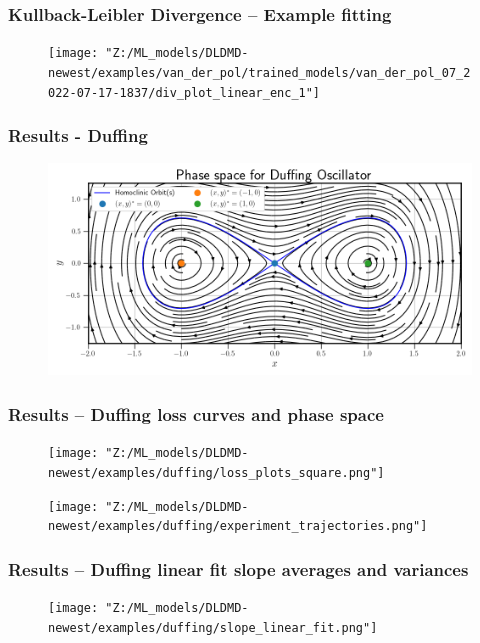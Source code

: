 \documentclass[11pt,aspectratio=169]{beamer}
\begin{document}
    \begin{frame}
        \frametitle{Kullback-Leibler Divergence -- Example fitting}
        \begin{figure}
            \centering
            \texttt{[image: "Z:/ML\_models/DLDMD-newest/examples/van\_der\_pol/trained\_models/van\_der\_pol\_07\_2022-07-17-1837/div\_plot\_linear\_enc\_1"]}
        \end{figure}
    \end{frame}

    \begin{frame}
        \frametitle{Results - Duffing}
        \begin{figure}
            \centering
            \includegraphics[width=\textwidth]{../Figures/duffing_phase_space.png}
        \end{figure}
    \end{frame}

    \begin{frame}
        \frametitle{Results -- Duffing loss curves and phase space}
        \begin{figure}
            \centering
            \begin{minipage}{.5\textwidth}
                \texttt{[image: "Z:/ML\_models/DLDMD-newest/examples/duffing/loss\_plots\_square.png"]}
            \end{minipage}%
            \begin{minipage}{.5\textwidth}
                \texttt{[image: "Z:/ML\_models/DLDMD-newest/examples/duffing/experiment\_trajectories.png"]}
            \end{minipage}
        \end{figure}
    \end{frame}
    
    \begin{frame}
        \frametitle{Results -- Duffing linear fit slope averages and variances}
        \begin{figure}
            \centering
            \texttt{[image: "Z:/ML\_models/DLDMD-newest/examples/duffing/slope\_linear\_fit.png"]}
        \end{figure}
    \end{frame}
\end{document}
